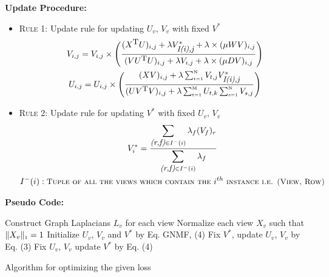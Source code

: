 \documentclass[a4paper]{article}
\begin{document}
	\noindent
	\textbf{Update Procedure:}
	\begin{itemize}
		\item \textsc{Rule 1:}	Update rule for updating $U_{v}$, ${V_{v}}$ with fixed $V^{*}$ 
			\begin{multline}
			V_{i,j} = V_{i,j} \times \Bigg( \frac{(X^{\text{\small{T}}}U)_{i,j}+\lambda V^{*}_{{\textit{\small{I(i),j}}}} +\lambda \times (\mu WV)_{i,j}}{(V U^{\text{\small{T}}} U)_{i,j} + \lambda V_{i,j} +\lambda \times (\mu DV)_{i,j}} \Bigg) \\
			U_{i,j} = U_{i,j} \times \Bigg( \frac{(XV)_{i,j}
			+ \lambda  \sum_{\text{\tiny{t=1}}}^{\text{\tiny{N}}} 
			V_{t,j}V^{*}_\textit{\small{I(i),j}}}
			{(U V^{\text{\small{T}}} V)_{i,j} 
			+ \lambda \sum_{\text{\tiny{t=1}}}^{\text{\tiny{M}}} U_{t,k} 
			\sum_{\text{\tiny{s=1}}}^{\text{\tiny{N}}}V_{s,j}} \Bigg)
			\end{multline}
		\item \textsc{Rule 2:}	Update rule for updating $V^{*}$ with fixed $U_{v}$, ${V_{v}}$ 
			\begin{multline}
			V_{i}^{*} = \frac
			{\displaystyle \sum_{\textit{\small{(r,f)}} \in I^{-}(i)} \lambda_{f} (V_{f})_{r}}
			{\displaystyle \sum_{\textit{\small{(r,f)}} \in I^{-}(i)} \lambda_{f} }\\
			 I^{-}(i) : 
			\textsc{\small{Tuple of all the views which contain the }} i^{th} {\textsc{\small{ instance i.e. (View, Row)}}}
			\end{multline}
	\end{itemize}		
	
	\noindent
	\textbf{Pseudo Code:}	
	\begin{algorithm}
		Construct Graph Laplacians $L_{v}$ for each view\;
		Normalize each view $X_{v}$ such that $\|X_{v}\|_{\text{\tiny1}} = 1 $\;
		Initialize  $U_{v}$, $V_{v}$ and $V^{*}$ by Eq. GNMF, (4)\;
		{
			{
				{
					Fix $V^{*}$, update $U_{v}$, $V_{v}$ by Eq. (3)\;
				}
			}
			Fix $U_{v}$, $V_{v}$ update $V^{*}$ by Eq. (4)\;		
		}						
		\caption{Algorithm for optimizing the given loss}
	\end{algorithm}
\end{document}
